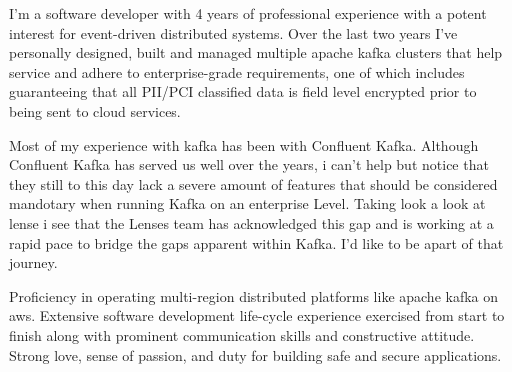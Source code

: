 \documentclass[11pt, a4paper]{awesome-cv} %
\begin{document}
\makecvheader %

\makelettertitle %


\begin{cvletter}



I'm a software developer with 4 years of professional experience with a potent interest for event-driven distributed systems. Over the last two years I've personally designed, built and managed multiple apache kafka clusters that help service and adhere to enterprise-grade requirements, one of which includes guaranteeing that all PII/PCI classified data is field level encrypted prior to being sent to cloud services.



Most of my experience with kafka has been with Confluent Kafka. Although Confluent Kafka has served us well over the years, i can't help but notice that they still to this day lack a severe amount of features that should be considered mandotary when running Kafka on an enterprise Level. Taking look a look at lense i see that the Lenses team has acknowledged this gap and is working at a rapid pace to bridge the gaps apparent within Kafka. I'd like to be apart of that journey.



Proficiency in operating multi-region distributed platforms like apache kafka on aws. Extensive software development life-cycle experience exercised from start to finish along with prominent communication skills and constructive attitude. Strong love, sense of passion, and duty for building safe and secure applications. 


\end{cvletter}


\makeletterclosing %
\end{document}
